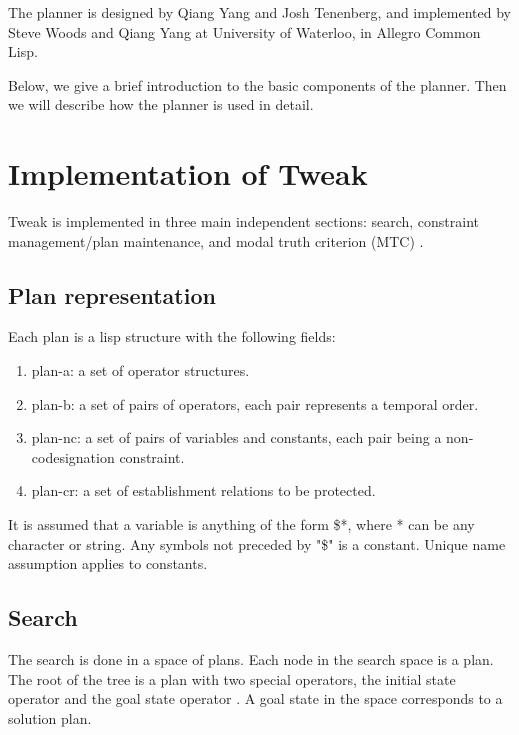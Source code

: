 The planner is designed by Qiang Yang and Josh Tenenberg, and implemented by Steve Woods and Qiang Yang at University of Waterloo, in Allegro Common Lisp.  

Below, we give a brief introduction to the basic components of the planner.  Then we will describe how the planner is used in detail.

\section{Implementation of Tweak}
Tweak is implemented in three main independent sections: search, constraint management/plan maintenance, and modal truth criterion (MTC) .  

\subsection{Plan representation}
Each plan is a lisp structure with the following fields:
\begin{enumerate}
\item plan-a:  a set of operator structures.
\item plan-b: a set of pairs of operators, each pair represents a temporal order.
\item plan-nc: a set of pairs of variables and constants, each pair being a non-codesignation constraint.
\item plan-cr: a set of establishment relations to be protected.
\end{enumerate}

It is assumed that a variable is anything of the form \$*, where * can be any character or string.  Any symbols not preceded by "\$" is a constant.  Unique name assumption applies to constants.

\subsection{Search}
The search is done in a space of plans.  Each node in the search space is a plan.  The root of the tree is a plan with two special operators, the initial state operator and the goal state operator \cite{abtweak}.  A goal state in the space corresponds to a solution plan.

